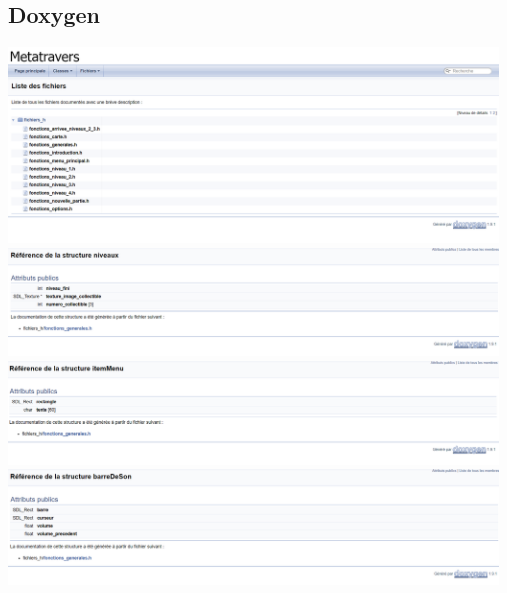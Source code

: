 \documentclass[12pt,a4paper]{article}
\begin{document}
        \newpage

        \subsection{Doxygen}
            \label{subsec:doxygen}
            
            \begin{center}
                \includegraphics[width=13cm]{images/doxygen_html.png}\\
                \includegraphics[width=13cm]{images/doxygen_niveau.png}\\
                \includegraphics[width=13cm]{images/doxygen_itemMenu.png}\\
                \includegraphics[width=13cm]{images/doxygen_barreDeSon.png}
            \end{center}
            
\end{document}
